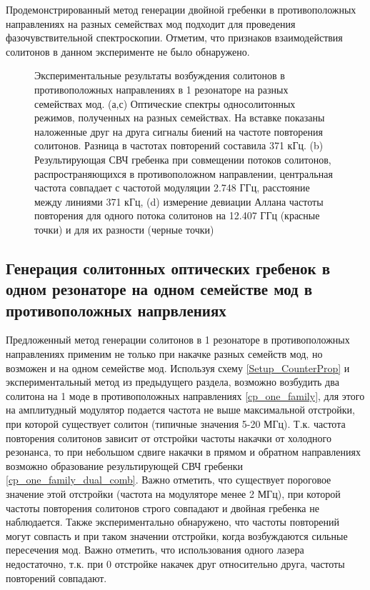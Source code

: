 Продемонстрированный метод генерации двойной гребенки в противоположных направлениях на разных семействах мод подходит для проведения фазочувствительной спектроскопии. Отметим, что признаков взаимодействия солитонов в данном эксперименте не было обнаружено. 

\begin{figure}[ht]
\begin{minipage}[ht]{1\linewidth}
\end{minipage}
\caption{Экспериментальные результаты возбуждения солитонов в противоположных направлениях в 1 резонаторе на разных семействах мод. (а,с) Оптические спектры односолитонных режимов, полученных на разных семействах. На вставке показаны наложенные друг на друга сигналы биений на частоте повторения солитонов. Разница в частотах повторений составила 371 кГц. (b) Результирующая СВЧ гребенка при совмещении потоков солитонов, распространяющихся в противоположном направлении, центральная частота совпадает с частотой модуляции 2.748 ГГц, расстояние между линиями 371 кГц, (d) измерение девиации Аллана частоты повторения для одного потока солитонов на 12.407 ГГц (красные точки) и для их разности (черные точки)}
\label{counter_prop_results}
\end{figure}

\subsection{Генерация солитонных оптических гребенок в одном резонаторе на одном семействе мод в противоположных напрвлениях}

Предложенный метод генерации солитонов в 1 резонаторе в противоположных направлениях применим не только при накачке разных семейств мод, но возможен и на одном семействе мод. Используя схему \ref{Setup_CounterProp} и экспериментальный метод из предыдущего раздела, возможно возбудить два солитона на 1 моде в противоположных направлениях \ref{cp_one_family}, для этого на амплитудный модулятор подается частота не выше максимальной отстройки, при которой существует солитон (типичные значения 5-20 МГц). Т.к. частота повторения солитонов зависит от отстройки частоты накачки от холодного резонанса, то при небольшом сдвиге накачки в прямом и обратном направлениях возможно образование результирующей СВЧ гребенки \ref{cp_one_family_dual_comb}. Важно отметить, что существует пороговое значение этой отстройки (частота на модуляторе менее 2 МГц), при которой частоты повторения солитонов строго совпадают и двойная гребенка не наблюдается. Также экспериментально обнаружено, что частоты повторений могут совпасть и при таком значении отстройки, когда возбуждаются сильные пересечения мод. Важно отметить, что использования одного лазера недостаточно, т.к. при 0 отстройке накачек друг относительно друга, частоты повторений совпадают.

